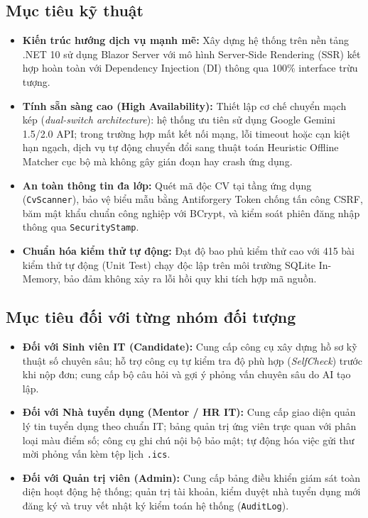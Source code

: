 \subsection{Mục tiêu kỹ thuật}
\begin{itemize}
    \item \textbf{Kiến trúc hướng dịch vụ mạnh mẽ:} Xây dựng hệ thống trên nền tảng .NET 10 sử dụng Blazor Server với mô hình Server-Side Rendering (SSR) kết hợp hoàn toàn với Dependency Injection (DI) thông qua 100\% interface trừu tượng.
    \item \textbf{Tính sẵn sàng cao (High Availability):} Thiết lập cơ chế chuyển mạch kép (\textit{dual-switch architecture}): hệ thống ưu tiên sử dụng Google Gemini 1.5/2.0 API; trong trường hợp mất kết nối mạng, lỗi timeout hoặc cạn kiệt hạn ngạch, dịch vụ tự động chuyển đổi sang thuật toán Heuristic Offline Matcher cục bộ mà không gây gián đoạn hay crash ứng dụng.
    \item \textbf{An toàn thông tin đa lớp:} Quét mã độc CV tại tầng ứng dụng (\texttt{CvScanner}), bảo vệ biểu mẫu bằng Antiforgery Token chống tấn công CSRF, băm mật khẩu chuẩn công nghiệp với BCrypt, và kiểm soát phiên đăng nhập thông qua \texttt{SecurityStamp}.
    \item \textbf{Chuẩn hóa kiểm thử tự động:} Đạt độ bao phủ kiểm thử cao với 415 bài kiểm thử tự động (Unit Test) chạy độc lập trên môi trường SQLite In-Memory, bảo đảm không xảy ra lỗi hồi quy khi tích hợp mã nguồn.
\end{itemize}

\subsection{Mục tiêu đối với từng nhóm đối tượng}
\begin{itemize}
    \item \textbf{Đối với Sinh viên IT (Candidate):} Cung cấp công cụ xây dựng hồ sơ kỹ thuật số chuyên sâu; hỗ trợ công cụ tự kiểm tra độ phù hợp (\textit{SelfCheck}) trước khi nộp đơn; cung cấp bộ câu hỏi và gợi ý phỏng vấn chuyên sâu do AI tạo lập.
    \item \textbf{Đối với Nhà tuyển dụng (Mentor / HR IT):} Cung cấp giao diện quản lý tin tuyển dụng theo chuẩn IT; bảng quản trị ứng viên trực quan với phân loại màu điểm số; công cụ ghi chú nội bộ bảo mật; tự động hóa việc gửi thư mời phỏng vấn kèm tệp lịch \texttt{.ics}.
    \item \textbf{Đối với Quản trị viên (Admin):} Cung cấp bảng điều khiển giám sát toàn diện hoạt động hệ thống; quản trị tài khoản, kiểm duyệt nhà tuyển dụng mới đăng ký và truy vết nhật ký kiểm toán hệ thống (\texttt{AuditLog}).
\end{itemize}

